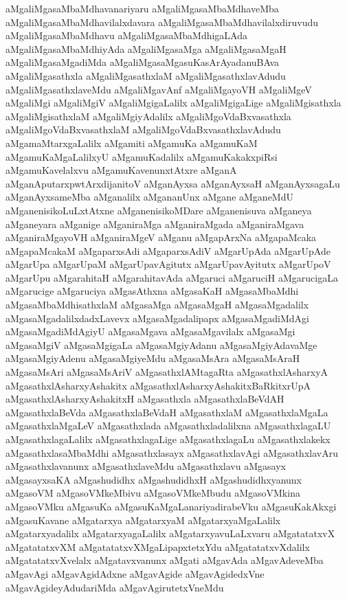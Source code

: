 {aMgaliMgasaMbaMdhavanariyaru
aMgaliMgasaMbaMdhaveMba
aMgaliMgasaMbaMdhavilalxdavara
aMgaliMgasaMbaMdhavilalxdiruvudu
aMgaliMgasaMbaMdhavu
aMgaliMgasaMbaMdhigaLAda
aMgaliMgasaMbaMdhiyAda
aMgaliMgasaMga
aMgaliMgasaMgaH
aMgaliMgasaMgadiMda
aMgaliMgasaMgasuKasArAyadanuBAva
aMgaliMgasathxla
aMgaliMgasathxlaM
aMgaliMgasathxlavAdudu
aMgaliMgasathxlaveMdu
aMgaliMgavAnf
aMgaliMgayoVH
aMgaliMgeV
aMgaliMgi
aMgaliMgiV
aMgaliMgigaLalilx
aMgaliMgigaLige
aMgaliMgisathxla
aMgaliMgisathxlaM
aMgaliMgiyAdalilx
aMgaliMgoVdaBxvasathxla
aMgaliMgoVdaBxvasathxlaM
aMgaliMgoVdaBxvasathxlavAdudu
aMgamaMtarxgaLalilx
aMgamiti
aMgamuKa
aMgamuKaM
aMgamuKaMgaLalilxyU
aMgamuKadalilx
aMgamuKakakxpiRsi
aMgamuKavelalxvu
aMgamuKavenunxtAtxre
aMganA
aMganAputarxpwtArxdijanitoV
aMganAyxsa
aMganAyxsaH
aMganAyxsagaLu
aMganAyxsameMba
aMganalilx
aMgananUnx
aMgane
aMganeMdU
aMganenisikoLuLxtAtxne
aMganenisikoMDare
aMganenisuva
aMganeya
aMganeyara
aMganige
aMganiraMga
aMganiraMgada
aMganiraMgava
aMganiraMgayoVH
aMganiraMgeV
aMganu
aMgapArxNa
aMgapaMcaka
aMgapaMcakaM
aMgaparxsAdi
aMgaparxsAdiV
aMgarUpAda
aMgarUpAde
aMgarUpa
aMgarUpaM
aMgarUpavAgitutx
aMgarUpavAyitutx
aMgarUpoV
aMgarUpu
aMgarahitaH
aMgarahitavAda
aMgaruci
aMgaruciH
aMgarucigaLa
aMgarucige
aMgaruciya
aMgasAthxna
aMgasaKaH
aMgasaMbaMdhi
aMgasaMbaMdhisathxlaM
aMgasaMga
aMgasaMgaH
aMgasaMgadalilx
aMgasaMgadalilxdadxLavevx
aMgasaMgadalipapx
aMgasaMgadiMdAgi
aMgasaMgadiMdAgiyU
aMgasaMgava
aMgasaMgavilalx
aMgasaMgi
aMgasaMgiV
aMgasaMgigaLa
aMgasaMgiyAdanu
aMgasaMgiyAdavaMge
aMgasaMgiyAdenu
aMgasaMgiyeMdu
aMgasaMsAra
aMgasaMsAraH
aMgasaMsAri
aMgasaMsAriV
aMgasathxlAMtagaRta
aMgasathxlAsharxyA
aMgasathxlAsharxyAshakitx
aMgasathxlAsharxyAshakitxBaRkitxrUpA
aMgasathxlAsharxyAshakitxH
aMgasathxla
aMgasathxlaBeVdAH
aMgasathxlaBeVda
aMgasathxlaBeVdaH
aMgasathxlaM
aMgasathxlaMgaLa
aMgasathxlaMgaLeV
aMgasathxlada
aMgasathxladalilxna
aMgasathxlagaLU
aMgasathxlagaLalilx
aMgasathxlagaLige
aMgasathxlagaLu
aMgasathxlakekx
aMgasathxlasaMbaMdhi
aMgasathxlasayx
aMgasathxlavAgi
aMgasathxlavAru
aMgasathxlavanunx
aMgasathxlaveMdu
aMgasathxlavu
aMgasayx
aMgasayxsaKA
aMgashudidhx
aMgashudidhxH
aMgashudidhxyanunx
aMgasoVM
aMgasoVMkeMbivu
aMgasoVMkeMbudu
aMgasoVMkina
aMgasoVMku
aMgasuKa
aMgasuKaMgaLanariyadirabeVku
aMgasuKakAkxgi
aMgasuKavane
aMgatarxya
aMgatarxyaM
aMgatarxyaMgaLalilx
aMgatarxyadalilx
aMgatarxyagaLalilx
aMgatarxyavuLaLxvaru
aMgatatatxvX
aMgatatatxvXM
aMgatatatxvXMgaLipapxtetxYdu
aMgatatatxvXdalilx
aMgatatatxvXvelalx
aMgatavxvanunx
aMgati
aMgavAda
aMgavAdeveMba
aMgavAgi
aMgavAgidAdxne
aMgavAgide
aMgavAgidedxVne
aMgavAgideyAdudariMda
aMgavAgirutetxVneMdu
}
